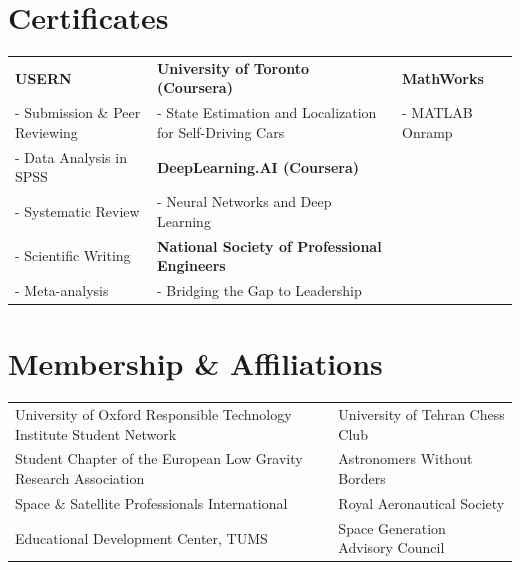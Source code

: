 \documentclass[a4,25pt]{article}
\begin{document}
\section*{Certificates}
\vspace{-0.2cm}
\hspace{0.5cm}\begin{tabular}{>{}p{} p{}p{}}
\textbf{USERN} & \textbf{University of Toronto (Coursera)} & \textbf{MathWorks} \\
- Submission \& Peer Reviewing & - State Estimation and Localization for Self-Driving Cars & - MATLAB Onramp \\
- Data Analysis in SPSS & \textbf{DeepLearning.AI (Coursera)} \\
- Systematic Review & - Neural Networks and Deep Learning & \\
- Scientific Writing & \textbf{National Society of Professional Engineers} &  \\
- Meta-analysis & - Bridging the Gap to Leadership & \\
\end{tabular}
\section*{Membership \& Affiliations}\vspace{-0.2cm}
\hspace{0.5cm}\begin{tabular}{>{}p{} p{}}
University of Oxford Responsible Technology Institute Student Network & University of Tehran Chess Club \\
Student Chapter of the European Low Gravity Research Association & Astronomers Without Borders \\
Space \& Satellite Professionals International & Royal Aeronautical Society \\
Educational Development Center, TUMS & Space Generation Advisory Council 
\end{tabular}
\end{document}
